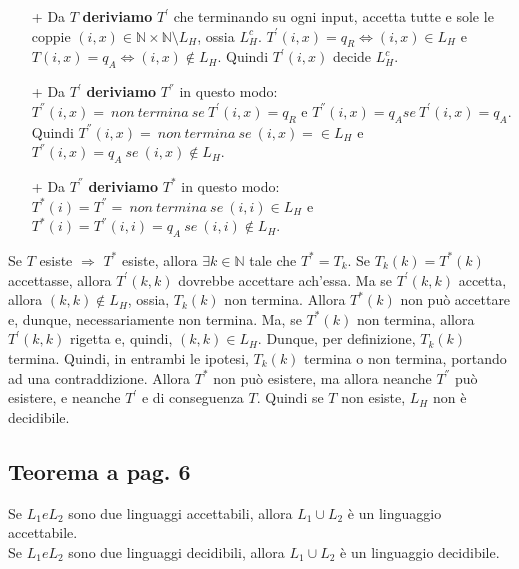 \begin{enumerate}
    \item [+]{
        Da $T$ \textbf{deriviamo} $T^{'}$ che terminando su ogni input, accetta tutte e sole le coppie $(i, x) \in \mathbb{N} \times \mathbb{N} \setminus L_{H}$, ossia $L_{H}^{c}$.
        $T^{'}(i, x) = q_{R} \Leftrightarrow (i, x)\in L_{H}$ e $T(i, x) = q_{A} \Leftrightarrow (i, x)\notin L_{H}$.
        Quindi $T^{'}(i, x)$ decide $L_{H}^{c}$.
    }
    \item [+]{
        Da $T^{'}$ \textbf{deriviamo} $T^{''}$ in questo modo:\\
        $T^{''}(i, x) =\ non\ termina\ se\ T^{'}(i, x) = q_{R}$ e $T^{''}(i, x) = q_{A} se\ T^{'}(i, x) = q_{A}$.\\
        Quindi $T^{''}(i, x) =\ non\ termina\ se\ (i, x) = \in L_{H}$ e $T^{''}(i, x) = q_{A}\ se\ (i, x) \notin L_{H}$.
    }
    \item [+]{
        Da $T^{''}$ \textbf{deriviamo} $T^{*}$ in questo modo:\\
        $T^{*}(i) = T^{''} = \ non\ termina\ se\ (i, i) \in L_{H}$ e $T^{*}(i) = T^{''}(i, i) = q_{A}\ se\ (i, i) \notin L_{H}$.\\
    }
\end{enumerate}

Se $T$ esiste $\Rightarrow$ $T^{*}$ esiste, allora $\exists k\in \mathbb{N}$ tale che $T^{*} = T_{k}$. Se $T_{k}(k) = T^{*}(k)$ accettasse, allora $T^{'}(k, k)$ dovrebbe accettare
ach'essa. Ma se $T^{'}(k, k)$ accetta, allora $(k, k)\notin L_{H}$, ossia, $T_{k}(k)$ non termina. Allora $T^{*}(k)$ non può accettare e, dunque, necessariamente non termina.
Ma, se $T^{*}(k)$ non termina, allora $T^{'}(k, k)$ rigetta e, quindi, $(k, k)\in L_{H}$. Dunque, per definizione, $T_{k}(k)$ termina. Quindi, in entrambi le ipotesi, $T_{k}(k)$ termina
o non termina, portando ad una contraddizione. Allora $T^{*}$ non può esistere, ma allora neanche $T^{''}$ può esistere, e neanche $T^{'}$ e di conseguenza $T$.
Quindi se $T$ non esiste, $L_{H}$ non è decidibile.

\subsection{Teorema a pag. 6}

Se $L_{1} e L_{2}$ sono due linguaggi accettabili, allora $L_{1} \cup L_{2}$ è un linguaggio accettabile.\\
Se $L_{1} e L_{2}$ sono due linguaggi decidibili, allora $L_{1} \cup L_{2}$ è un linguaggio decidibile.


